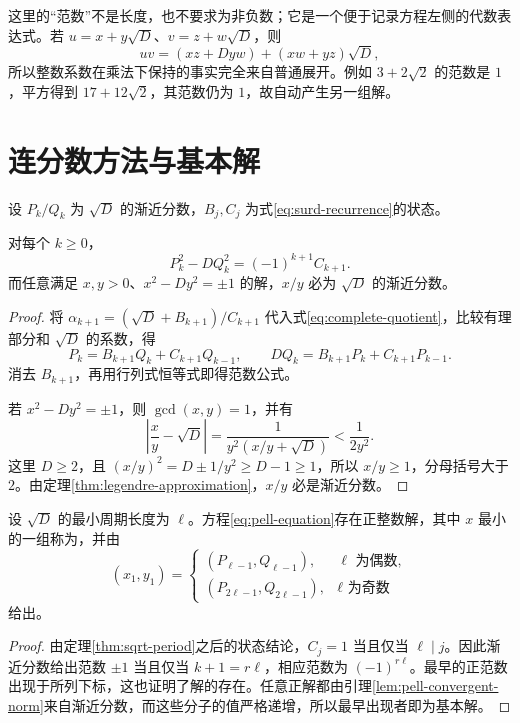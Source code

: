 \documentclass[UTF8,12pt,a4paper,fontset=fandol]{ctexbook}
\begin{document}
这里的“范数”不是长度，也不要求为非负数；它是一个便于记录方程左侧的代数表达式。若 $u=x+y\sqrt D$、$v=z+w\sqrt D$，则
\[
 uv=(xz+Dyw)+(xw+yz)\sqrt D,
\]
所以整数系数在乘法下保持的事实完全来自普通展开。例如 $3+2\sqrt2$ 的范数是 $1$，平方得到 $17+12\sqrt2$，其范数仍为 $1$，故自动产生另一组解。

\section{连分数方法与基本解}

设 $P_k/Q_k$ 为 $\sqrt D$ 的渐近分数，$B_j,C_j$ 为式\eqref{eq:surd-recurrence}的状态。

\begin{lemma}
\label{lem:pell-convergent-norm}
对每个 $k\ge0$，
\begin{equation}
 P_k^2-DQ_k^2=(-1)^{k+1}C_{k+1}.
 \label{eq:pell-convergent-norm}
\end{equation}
而任意满足 $x,y>0$、$x^2-Dy^2=\pm1$ 的解，$x/y$ 必为 $\sqrt D$ 的渐近分数。
\end{lemma}
\begin{proof}
将 $\alpha_{k+1}=(\sqrt D+B_{k+1})/C_{k+1}$ 代入式\eqref{eq:complete-quotient}，比较有理部分和 $\sqrt D$ 的系数，得
\[
 P_k=B_{k+1}Q_k+C_{k+1}Q_{k-1},\qquad
 DQ_k=B_{k+1}P_k+C_{k+1}P_{k-1}.
\]
消去 $B_{k+1}$，再用行列式恒等式即得范数公式。

若 $x^2-Dy^2=\pm1$，则 $\gcd(x,y)=1$，并有
\[
 \left|\frac xy-\sqrt D\right|
 =\frac1{y^2(x/y+\sqrt D)}<\frac1{2y^2}.
\]
这里 $D\ge2$，且 $(x/y)^2=D\pm1/y^2\ge D-1\ge1$，所以 $x/y\ge1$，分母括号大于 $2$。由定理\ref{thm:legendre-approximation}，$x/y$ 必是渐近分数。
\end{proof}

\begin{theorem}[基本解的周期公式]
\label{thm:pell-fundamental}
设 $\sqrt D$ 的最小周期长度为 $\ell$。方程\eqref{eq:pell-equation}存在正整数解，其中 $x$ 最小的一组称为，并由
\[
 (x_1,y_1)=
 \begin{cases}
 (P_{\ell-1},Q_{\ell-1}),&\ell\text{ 为偶数},\\
 (P_{2\ell-1},Q_{2\ell-1}),&\ell\text{ 为奇数}
 \end{cases}
\]
给出。
\end{theorem}
\begin{proof}
由定理\ref{thm:sqrt-period}之后的状态结论，$C_j=1$ 当且仅当 $\ell\mid j$。因此渐近分数给出范数 $\pm1$ 当且仅当 $k+1=r\ell$，相应范数为 $(-1)^{r\ell}$。最早的正范数出现于所列下标，这也证明了解的存在。任意正解都由引理\ref{lem:pell-convergent-norm}来自渐近分数，而这些分子的值严格递增，所以最早出现者即为基本解。
\end{proof}
\end{document}
